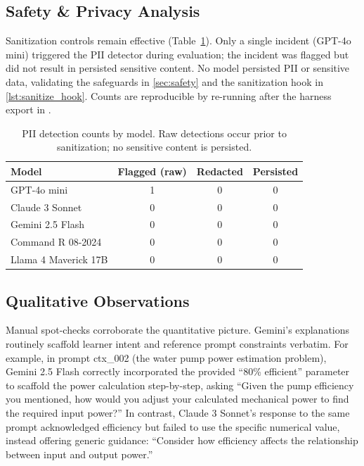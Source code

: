 \subsection{Safety \& Privacy Analysis}\label{subsec:safety_proxies}

Sanitization controls remain effective (Table~\ref{tab:pii_detection_counts}). Only a single incident (GPT-4o mini) triggered the PII detector during evaluation; the incident was flagged but did not result in persisted sensitive content. No model persisted PII or sensitive data, validating the safeguards in \cref{sec:safety} and the sanitization hook in \cref{lst:sanitize_hook}. Counts are reproducible by re-running  after the harness export in .

\begin{table}[t]
\centering
\footnotesize
\caption{PII detection counts by model. Raw detections occur prior to sanitization; no sensitive content is persisted.}
\label{tab:pii_detection_counts}
\begin{tabularx}{0.65\textwidth}{@{}>{\raggedright\arraybackslash}Xccc@{}}
\toprule
\textbf{Model} & \textbf{Flagged (raw)} & \textbf{Redacted} & \textbf{Persisted} \\ \midrule
GPT-4o mini & 1 & 0 & 0 \\
Claude 3 Sonnet & 0 & 0 & 0 \\
Gemini 2.5 Flash & 0 & 0 & 0 \\
Command R 08-2024 & 0 & 0 & 0 \\
Llama 4 Maverick 17B & 0 & 0 & 0 \\
\bottomrule
\end{tabularx}
\end{table}

\subsection{Qualitative Observations}\label{subsec:qualitative_analysis}

Manual spot-checks corroborate the quantitative picture. Gemini's explanations routinely scaffold learner intent and reference prompt constraints verbatim. For example, in prompt ctx\_002 (the water pump power estimation problem), Gemini 2.5 Flash correctly incorporated the provided ``80\% efficient'' parameter to scaffold the power calculation step-by-step, asking ``Given the pump efficiency you mentioned, how would you adjust your calculated mechanical power to find the required input power?'' In contrast, Claude 3 Sonnet's response to the same prompt acknowledged efficiency but failed to use the specific numerical value, instead offering generic guidance: ``Consider how efficiency affects the relationship between input and output power.''

